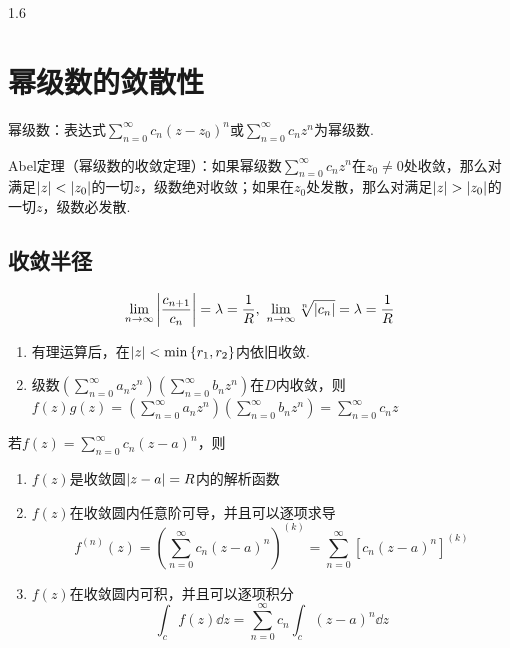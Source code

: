 \documentclass[lang=cn,10pt]{elegantbook}
\begin{document}
\begin{spacing}{1.6}
\section{幂级数的敛散性}
\begin{definition}
幂级数：表达式$\sum_{n=0}^{\infty}{c_n\left(z-z_0\right)^n}$或$\sum_{n=0}^{\infty}{c_nz^n}$为幂级数.
\end{definition}
\begin{theorem}
Abel定理（幂级数的收敛定理）：如果幂级数$\sum_{n=0}^{\infty}{c_nz^n}$在$z_0\neq 0$处收敛，那么对满足$\abs{z}<\abs{z_0}$的一切$z$，级数绝对收敛；如果在$z_0$处发散，那么对满足$\abs{z}>\abs{z_0}$的一切$z$，级数必发散.
\end{theorem}
\subsection{收敛半径}
$$\lim_{n\to\infty}\abs{\frac{c_{n+1}}{c_n}}=\lambda=\frac{1}{R},\ \lim_{n\to\infty}\sqrt[n]{\abs{c_n}}=\lambda=\frac{1}{R}$$
\begin{enumerate}
    \item 有理运算后，在$\abs{z}<\min\left\{r_1,r_2\right\}$内依旧收敛.
    \item 级数$\left(\sum_{n=0}^{\infty}a_nz^n\right)\left(\sum_{n=0}^{\infty}b_nz^n\right)$在$D$内收敛，则$f\left(z\right)g\left(z\right)=\left(\sum_{n=0}^{\infty}a_nz^n\right)\left(\sum_{n=0}^{\infty}b_nz^n\right)=\sum_{n=0}^{\infty}{c_nz}$
\end{enumerate}
\begin{property}
若$f\left(z\right)=\sum_{n=0}^{\infty}{c_n\left(z-a\right)^n}$，则
\begin{enumerate}
    \item $f\left(z\right)$是收敛圆$\abs{z-a}=R$内的解析函数
    \item $f\left(z\right)$在收敛圆内任意阶可导，并且可以逐项求导
    $$f^{\left(n\right)}\left(z\right)=\left(\sum_{n=0}^{\infty}{c_n\left(z-a\right)^n}\right)^{\left(k\right)}=\sum_{n=0}^{\infty}{\left[c_n\left(z-a\right)^n\right]^{\left(k\right)}}$$
    \item $f\left(z\right)$在收敛圆内可积，并且可以逐项积分
    $$\int_c{f\left(z\right)\dd z}=\sum_{n=0}^{\infty}{c_n\int_c{\left(z-a\right)^n\dd z}}$$
\end{enumerate}
\end{property}

\end{spacing}
\end{document}
